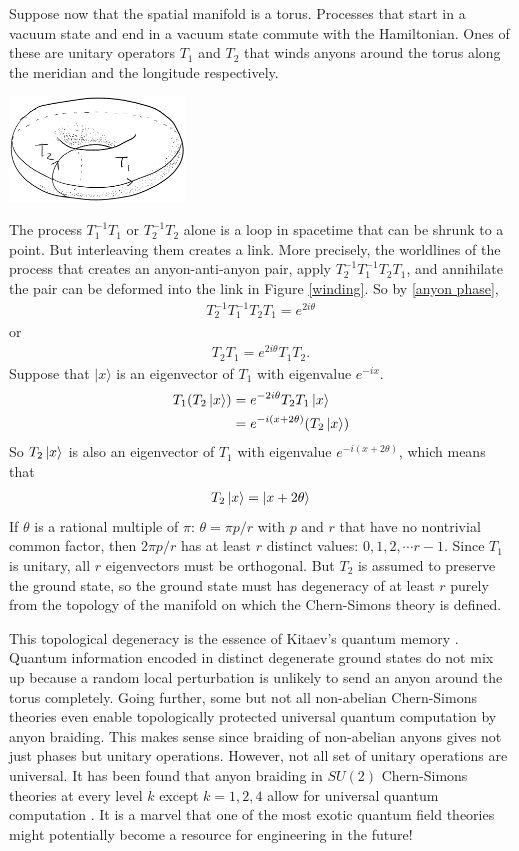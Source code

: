 \documentclass[aps,nofootinbib]{revtex4}
\begin{document}
Suppose now that the spatial manifold is a torus. Processes that start in a vacuum state and end in a vacuum state commute with the Hamiltonian. Ones of these are unitary operators $T_1$ and $T_2$ that winds anyons around the torus along the meridian and the longitude respectively.
\begin{center}
\includegraphics[width=0.35\textwidth]{torus.png}
\end{center}
The process $T_1^{-1}T_1$ or $T_2^{-1}T_2$ alone is a loop in spacetime that can be shrunk to a point. But interleaving them creates a link. More precisely, the worldlines of the process that creates an anyon-anti-anyon pair, apply $T_2^{-1} T_1^{-1} T_2 T_1$, and annihilate the pair can be deformed into the link in Figure \ref{winding}. So by \eqref{anyon phase},
\begin{align*}
T_2^{-1} T_1^{-1} T_2 T_1 = e^{2i\theta}
\end{align*}
or
\begin{align}
T_2 T_1 = e^{2i\theta} T_1 T_2.
\end{align}
Suppose that $|x \rangle$ is an eigenvector of $T_1$ with eigenvalue $e^{-ix}$.
\begin{align*}
T_1 (T_2 \ket{x}) &= e^{-2i\theta} T_2 T_1 \ket{x} \\
	&= e^{-i (x + 2\theta)} (T_2 \ket{x})
\end{align*}
So $T_2 \ket{x}$ is also an eigenvector of $T_1$ with eigenvalue $e^{-i (x + 2\theta)}$, which means that
\begin{align}
T_2 \ket{x} = \ket{x+2\theta}
\end{align}
If $\theta$ is a rational multiple of $\pi$: $\theta = \pi p/r$ with $p$ and $r$ that have no nontrivial common factor, then $ 2\pi p/r$ has at least $r$ distinct values: $0,1,2,\cdots r-1$. Since $T_1$ is unitary, all $r$ eigenvectors must be orthogonal. But $T_2$ is assumed to preserve the ground state, so the ground state must has degeneracy of at least $r$ purely from the topology of the manifold on which the Chern-Simons theory is defined.

This topological degeneracy is the essence of Kitaev's quantum memory \cite{Preskill}. Quantum information encoded in distinct degenerate ground states do not mix up because a random local perturbation is unlikely to send an anyon around the torus completely. Going further, some but not all non-abelian Chern-Simons theories even enable topologically protected universal quantum computation by anyon braiding. This makes sense since braiding of non-abelian anyons gives not just phases but unitary operations. However, not all set of unitary operations are universal. It has been found that anyon braiding in $SU(2)$ Chern-Simons theories at every level $k$ except $k=1,2,4$ allow for universal quantum computation \cite{Pachos12}. It is a marvel that one of the most exotic quantum field theories might potentially become a resource for engineering in the future!
\end{document}
